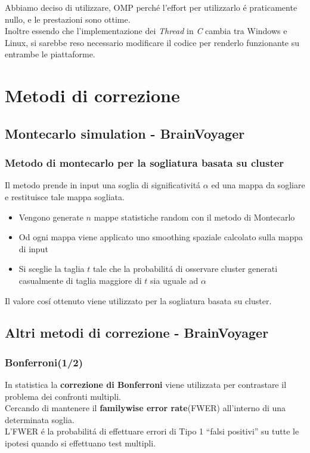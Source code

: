 \documentclass{beamer}
\begin{document}
\begin{frame}
Abbiamo deciso di utilizzare, OMP perch\'e l'effort per utilizzarlo \'e praticamente nullo, e le prestazioni sono ottime.\\
\medskip
Inoltre essendo che l'implementazione dei \textit{Thread} in \textit{C} cambia tra Windows e Linux, si sarebbe reso necessario modificare il codice per renderlo funzionante su entrambe le piattaforme.
\end{frame}

\section{Metodi di correzione}
\subsection{Montecarlo simulation - BrainVoyager}
\begin{frame}
\frametitle{Metodo di montecarlo per la sogliatura basata su cluster}
Il metodo prende in input una soglia di significativit\'a $\alpha$ ed una mappa da sogliare e restituisce tale mappa sogliata.
\begin{itemize}
\item Vengono generate $n$ mappe statistiche random con il metodo di Montecarlo
\item Od ogni mappa viene applicato uno smoothing spaziale calcolato sulla mappa di input
\item Si sceglie la taglia $t$ tale che la probabilit\'a  di osservare cluster generati casualmente di taglia maggiore di $t$ sia uguale ad $\alpha$
\end{itemize}
Il valore cos\'i ottenuto viene utilizzato per la sogliatura basata su cluster. 
\end{frame}

\subsection{Altri metodi di correzione - BrainVoyager}
\begin{frame}
\frametitle{Bonferroni(1/2)}
In statistica la \textbf{correzione di Bonferroni} viene utilizzata per contrastare il problema dei confronti multipli.\\
\medskip
Cercando di mantenere il \textbf{familywise error rate}(FWER) all'interno di una determinata soglia.\\
\medskip
L'FWER \'e la probabilit\'a di effettuare errori di Tipo 1 ``falsi positivi'' su tutte le ipotesi quando si effettuano test multipli.
\end{frame}
\end{document}
